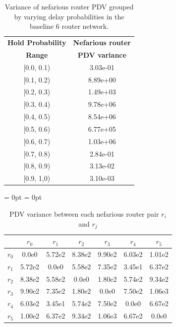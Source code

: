 \begin{table}[H]
 \centering
  \begin{tabular}{@{}cS[table-format=1.2e1]@{}}
   \toprule
    \textbf{Hold Probability} & \textbf{Nefarious router} \\
    \textbf{Range} & \textbf{PDV variance} \\
   \midrule
    {[}0.0, 0.1{)} & 3.03e-01  \\
    {[}0.1, 0.2{)} & 8.89e+00  \\
    {[}0.2, 0.3{)} & 1.49e+03  \\
    {[}0.3, 0.4{)} & 9.78e+06  \\
    {[}0.4, 0.5{)} & 8.54e+06  \\
    {[}0.5, 0.6{)} & 6.77e+05  \\
    {[}0.6, 0.7{)} & 1.03e+06  \\
    {[}0.7, 0.8{)} & 2.84e-01  \\
    {[}0.8, 0.9{)} & 3.13e-02  \\
    {[}0.9, 1,0{)} & 3.10e-03  \\
   \bottomrule
  \end{tabular}
  \caption{Variance of nefarious router PDV grouped by varying delay probabilities in the baseline 6 router network.}
    \label{tbl:MrouterPDAvars}
\end{table}
\begin{table}[H]
    \centering
    \aboverulesep = 0pt
    \belowrulesep = 0pt
    \begin{tabular}{l|S[table-format=1.2e1]S[table-format=1.2e1]S[table-format=1.2e1]S[table-format=1.2e1]S[table-format=1.2e1]S[table-format=1.2e1]}
        \toprule
        {} & {$r_0$} & {$r_1$} & {$r_2$} & {$r_3$} & {$r_4$} & {$r_5$} \\
        \midrule
        {$r_0$} & 0.0e0  & 5.72e2 & 8.38e2 & 9.90e2 & 6.03e2 & 1.01e2 \\
        {$r_1$} & 5.72e2 & 0.0e0  & 5.58e2 & 7.35e2 & 3.45e1 & 6.37e2 \\
        {$r_2$} & 8.38e2 & 5.58e2 & 0.0e0  & 1.80e2 & 5.74e2 & 9.34e2 \\
        {$r_3$} & 9.90e2 & 7.35e2 & 1.80e2 & 0.0e0  & 7.50e2 & 1.06e3 \\
        {$r_4$} & 6.03e2 & 3.45e1 & 5.74e2 & 7.50e2 & 0.0e0  & 6.67e2 \\
        {$r_5$} & 1.00e2 & 6.37e2 & 9.34e2 & 1.06e3 & 6.67e2 & 0.0e0  \\
        \bottomrule
    \end{tabular}
    \caption{PDV variance between each nefarious router pair $r_i$ and $r_j$}
    \label{tab:Rallvars}
\end{table}

